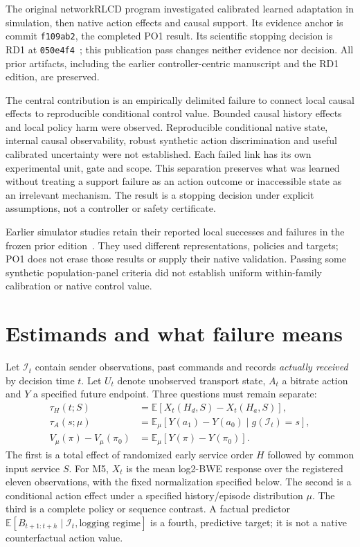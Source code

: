 \documentclass[10pt]{article}
\begin{document}
The original networkRLCD program investigated calibrated learned adaptation in
simulation, then native action effects and causal support. Its evidence anchor
is commit \texttt{f109ab2}, the completed PO1 result. Its scientific stopping
decision is RD1 at \texttt{050e4f4}~\cite{rd1}; this publication pass changes
neither evidence nor decision. All prior artifacts, including the earlier
controller-centric manuscript and the RD1 edition, are preserved.

The central contribution is an empirically delimited failure to connect local
causal effects to reproducible conditional control value. Bounded causal history
effects and local policy harm were observed. Reproducible conditional native
state, internal causal observability, robust synthetic action discrimination and
useful calibrated uncertainty were not established. Each failed link has its own
experimental unit, gate and scope. This separation preserves what was learned
without treating a support failure as an action outcome or inaccessible state
as an irrelevant mechanism. The result is a stopping decision under explicit
assumptions, not a controller or safety certificate.

Earlier simulator studies retain their reported local successes and failures
in the frozen prior edition~\cite{earlier}. They used different representations,
policies and targets; PO1 does not erase those results or supply their native
validation. Passing some synthetic population-panel criteria did not establish
uniform within-family calibration or native control value.

\section{Estimands and what failure means}
\label{sec:estimands}
Let $\mathcal I_t$ contain sender observations, past commands and records
\emph{actually received} by decision time $t$. Let $U_t$ denote unobserved
transport state, $A_t$ a bitrate action and $Y$ a specified future endpoint.
Three questions must remain separate:
\begin{align}
\tau_H(t;S)&=\mathbb E[X_t(H_d,S)-X_t(H_a,S)],\\
\tau_A(s;\mu)&=\mathbb E_{\mu}[Y(a_1)-Y(a_0)\mid g(\mathcal I_t)=s],\\
V_{\mu}(\pi)-V_{\mu}(\pi_0)&=\mathbb E_{\mu}[Y(\pi)-Y(\pi_0)].
\end{align}
The first is a total effect of randomized early service order $H$ followed by
common input service $S$. For M5, $X_t$ is the mean log2-BWE response over the
registered eleven observations, with the fixed normalization specified below.
The second is a conditional action effect under a
specified history/episode distribution $\mu$. The third is a complete policy
or sequence contrast. A factual predictor
$\mathbb E[B_{t+1:t+h}\mid\mathcal I_t,\text{logging regime}]$ is a fourth,
predictive target; it is not a native counterfactual action value.
\end{document}
